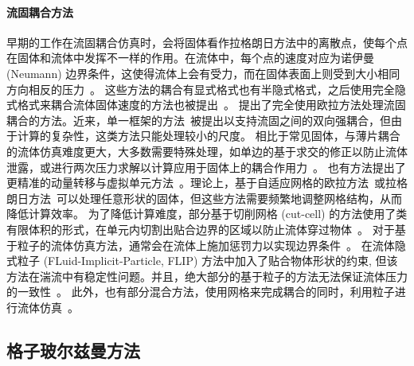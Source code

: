 \paragraph{流固耦合方法}
早期的工作在流固耦合仿真时，会将固体看作拉格朗日方法中的离散点，使每个点在固体和流体中发挥不一样的作用。在流体中，每个点的速度对应为诺伊曼 (Neumann) 边界条件，这使得流体上会有受力，而在固体表面上则受到大小相同方向相反的压力~\citep{Carlson-2004,Genevaux-2003,Takahashi-2002,Foster:2001,Yngve:2000}。
这些方法的耦合有显式格式也有半隐式格式，之后使用完全隐式格式来耦合流体固体速度的方法也被提出~\citep{Klingner-2006,Chentanez:2006:SCP,Batty-2007}。\citet{Teng-2016} 提出了完全使用欧拉方法处理流固耦合的方法。近来，单一框架的方法~\citep{takahashi-2020,fang-2020}被提出以支持流固之间的双向强耦合，但由于计算的复杂性，这类方法只能处理较小的尺度。
相比于常见固体，与薄片耦合的流体仿真难度更大，大多数需要特殊处理，如单边的基于求交的修正以防止流体泄露，或进行两次压力求解以计算应用于固体上的耦合作用力~\citep{Guendelman-2005}。
也有方法提出了更精准的动量转移与虚拟单元方法~\citep{Robinson:2009, Robinson-2008}。理论上，基于自适应网格的欧拉方法~\citep{Elcott-2007,Klingner-2006,Feldman:DF:2005,Feldman-2005,dai-2005}或拉格朗日方法~\citep{Clausen-2013,Misztal:2010}可以处理任意形状的固体，但这些方法需要频繁地调整网格结构，从而降低计算效率。
为了降低计算难度，部分基于切削网格 (cut-cell) 的方法使用了类有限体积的形式，在单元内切割出贴合边界的区域以防止流体穿过物体~\citep{Azevedo-2016,Liu:2015:MVF,weber-2015,Edwards-2014,gibou-2012,Ng-2009,Batty-2007,Roble-2005}。
对于基于粒子的流体仿真方法，通常会在流体上施加惩罚力以实现边界条件~\citep{peer-2015,Ihmsen-2013}。\citet{Gao:2017} 在流体隐式粒子 (FLuid-Implicit-Particle, FLIP) 方法中加入了贴合物体形状的约束, 但该方法在湍流中有稳定性问题。并且，绝大部分的基于粒子的方法无法保证流体压力的一致性~\citep{band-2018}。
此外，也有部分混合方法，使用网格来完成耦合的同时，利用粒子进行流体仿真~\citep{Fei-2019,Fei-2018,hu-2018,Zhang-2016}。

\subsection{格子玻尔兹曼方法}
\label{sec:1_related_works_LBM}
